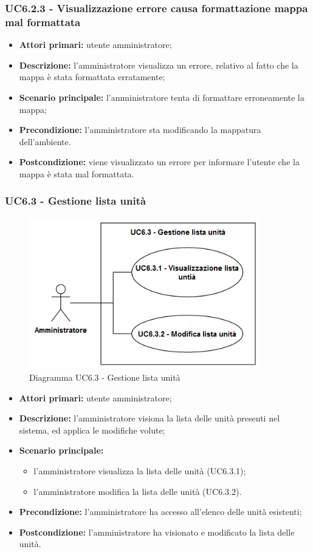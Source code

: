 \subsubsection{UC6.2.3 - Visualizzazione errore causa formattazione mappa mal formattata}
	\begin{itemize}
		\item \textbf{Attori primari:} utente amministratore;
		\item \textbf{Descrizione:} l'amministratore visualizza un errore, relativo al fatto che la mappa è stata formattata erratamente;
		\item \textbf{Scenario principale:} l'amministratore tenta di formattare erroneamente la mappa;
		\item \textbf{Precondizione:} l'amministratore sta modificando la mappatura dell'ambiente.
		\item \textbf{Postcondizione:} viene visualizzato un errore per informare l'utente che la mappa è stata mal formattata.
	\end{itemize}

\subsubsection{UC6.3 - Gestione lista unità}
	\begin{figure}[H]
		\centering
		\includegraphics[width=10cm]{images/UC6.3.png}
		\caption{Diagramma UC6.3 - Gestione lista unità}
	\end{figure}
	\begin{itemize}
		\item \textbf{Attori primari:} utente amministratore;
		\item \textbf{Descrizione:} l'amministratore visiona la lista delle unità presenti nel sistema, ed applica le modifiche volute;
		\item \textbf{Scenario principale:} 
			\begin{itemize}
				\item l'amministratore visualizza la lista delle unità (UC6.3.1);
				\item l'amministratore modifica la lista delle unità (UC6.3.2).
			\end{itemize}
		\item \textbf{Precondizione:} l'amministratore ha accesso all'elenco delle unità esistenti;
		\item \textbf{Postcondizione:} l'amministratore ha visionato e modificato la lista delle unità.
	\end{itemize}

